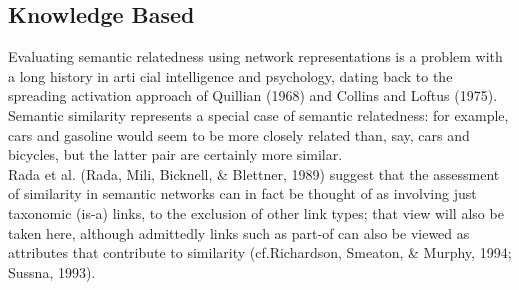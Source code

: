 \subsection{Knowledge Based}
Evaluating semantic relatedness using network representations is a problem with a long history in arti cial intelligence and psychology, dating back to the spreading activation approach of Quillian (1968) and Collins and Loftus (1975). Semantic similarity represents a special case of semantic relatedness: for example, cars and gasoline would seem to be more closely related than, say, cars and bicycles, but the latter pair are certainly more similar.\\
Rada et al. (Rada, Mili, Bicknell, & Blettner, 1989) suggest that the assessment of similarity in semantic networks can in fact be thought of as involving just taxonomic (is-a) links, to the exclusion of other link types; that view will also be taken here, although admittedly links such as part-of can also be viewed as attributes that contribute to similarity (cf.Richardson, Smeaton, & Murphy, 1994; Sussna, 1993).\\

